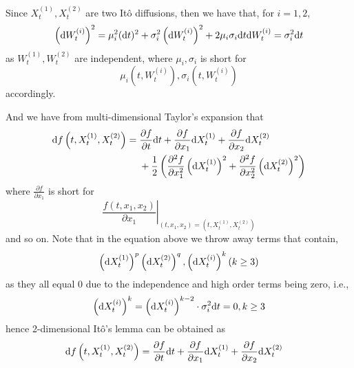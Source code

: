 \documentclass{homework}
\begin{document}
    \problem
    \begin{subproblem}[(\alph*)]
        \item
        Since $X_t^{(1)},X_t^{(2)}$ are two It\^o diffusions,
        then we have that, for $i=1,2$,
        \[\left(\mathrm d W_t^{(i)}\right)^2=\mu_i^2(\mathrm d t)^2
        +\sigma_i^2\left(\mathrm d W_t^{(i)}\right)^2
        +2\mu_i\sigma_i\mathrm d t\mathrm d W_t^{(i)}
        =\sigma_i^2\mathrm d t\]
        as $W_t^{(1)},W_t^{(2)}$ are independent, where
        $\mu_i,\sigma_i$ is short for
        \[\mu_i\left(t,W_t^{(i)}\right),
        \sigma_i\left(t,W_t^{(i)}\right)\]
        accordingly.

        And we have from multi-dimensional Taylor's expansion that
        \[\begin{aligned}
            \mathrm d f\left(t,X_t^{(1)},X_t^{(2)}\right)=
            \begin{aligned}[t]
            &\frac{\partial f}{\partial t}\mathrm d t
            +\frac{\partial f}{\partial x_1}\mathrm d X_t^{(1)}
            +\frac{\partial f}{\partial x_2}\mathrm d X_t^{(2)}\\
            &+\frac{1}{2}\left(
                \frac{\partial^2 f}{\partial x_1^2}\left(\mathrm d X_t^{(1)}\right)^2
                +\frac{\partial^2 f}{\partial x_2^2}\left(\mathrm d X_t^{(2)}\right)^2
            \right)
            \end{aligned}
        \end{aligned}\]
        where $\frac{\partial f}{\partial x_1}$ is short for
        \[\left.\frac{f(t,x_1,x_2)}{\partial x_1}
        \right|_{(t,x_1,x_2)=\left(t,X_t^{(1)},X_t^{(2)}\right)}\]
        and so on.
        Note that in the equation above we throw away terms that contain,
        \[\left(\mathrm d X_t^{(1)}\right)^p\left(\mathrm d X_t^{(2)}\right)^q,
        \left(\mathrm d X_t^{(i)}\right)^k(k\geq 3)\]
        as they all equal 0 due to the independence and high order
        terms being zero, i.e.,
        \[\left(\mathrm d X_t^{(i)}\right)^k
        =\left(\mathrm d X_t^{(i)}\right)^{k-2}\cdot\sigma_i^2\mathrm d t=0,
        k\geq 3\]
        hence 2-dimensional It\^o's lemma can be obtained as
        \begin{equation}
            \label{eq:2-d Ito lemma}
            \begin{aligned}
            \diff f\left(t,X_t^{(1)},X_t^{(2)}\right)&=
            \begin{aligned}[t]
            &\frac{\partial f}{\partial t}\diff t
            +\frac{\partial f}{\partial x_1}\diff X_t^{(1)}
            +\frac{\partial f}{\partial x_2}\diff X_t^{(2)}\\

\end{aligned}
\end{aligned}
\end{equation}
\end{subproblem}
\end{document}
